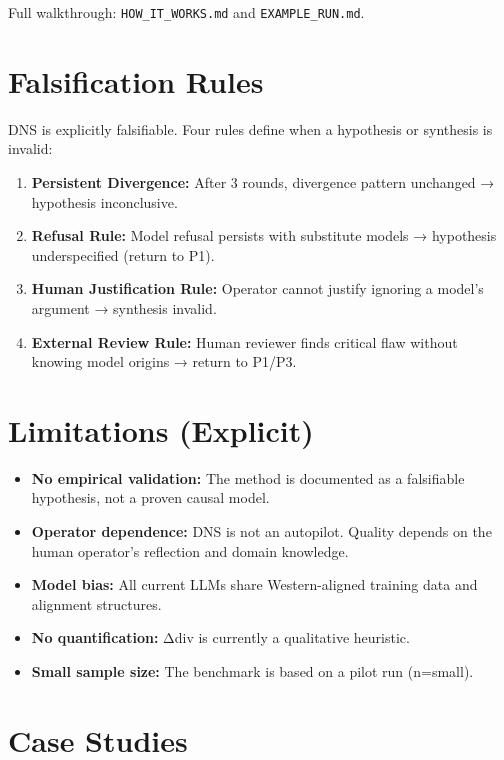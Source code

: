 \documentclass[12pt]{article}
\begin{document}
Full walkthrough: \texttt{HOW\_IT\_WORKS.md} and \texttt{EXAMPLE\_RUN.md}.

\section{Falsification Rules}

DNS is explicitly falsifiable. Four rules define when a hypothesis or synthesis is invalid:

\begin{enumerate}
    \item \textbf{Persistent Divergence:} After 3 rounds, divergence pattern unchanged → hypothesis inconclusive.
    \item \textbf{Refusal Rule:} Model refusal persists with substitute models → hypothesis underspecified (return to P1).
    \item \textbf{Human Justification Rule:} Operator cannot justify ignoring a model’s argument → synthesis invalid.
    \item \textbf{External Review Rule:} Human reviewer finds critical flaw without knowing model origins → return to P1/P3.
\end{enumerate}

\section{Limitations (Explicit)}

\begin{itemize}
    \item \textbf{No empirical validation:} The method is documented as a falsifiable hypothesis, not a proven causal model.
    \item \textbf{Operator dependence:} DNS is not an autopilot. Quality depends on the human operator’s reflection and domain knowledge.
    \item \textbf{Model bias:} All current LLMs share Western-aligned training data and alignment structures.
    \item \textbf{No quantification:} Δdiv is currently a qualitative heuristic.
    \item \textbf{Small sample size:} The benchmark is based on a pilot run (n=small).
\end{itemize}

\section{Case Studies}
\end{document}
